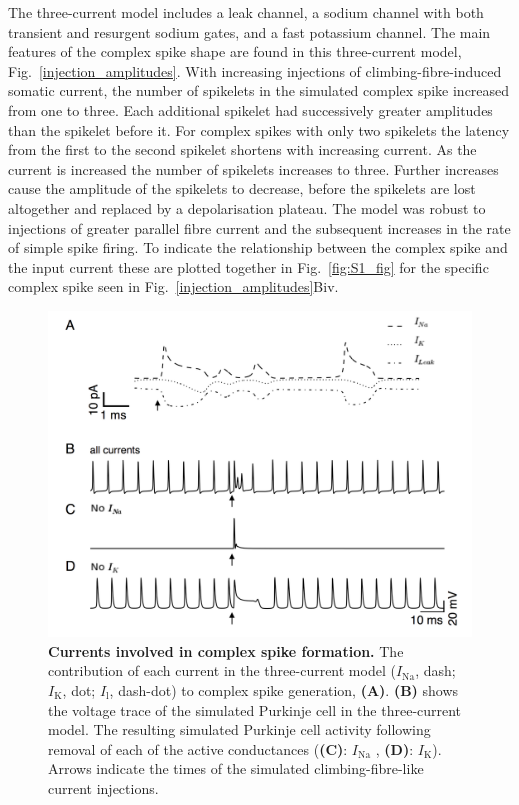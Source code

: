 \documentclass[twocolumn]{svjour3}          %
\renewcommand{\k}{\mathrm{K}}
\newcommand{\na}{\mathrm{Na}}
\newcommand{\leak}{\mathrm{l}}
\begin{document}
The three-current model includes a leak channel, a sodium channel with
both transient and resurgent sodium gates, and a fast potassium
channel. The main features of the complex spike shape are found in
this three-current model, Fig.~\ref{injection_amplitudes}. With
increasing injections of climbing-fibre-induced somatic current, the
number of spikelets in the simulated complex spike increased from one
to three. Each additional spikelet had successively greater amplitudes
than the spikelet before it. For complex spikes with only two
spikelets the latency from the first to the second spikelet shortens
with increasing current. As the current is increased the number of
spikelets increases to three. Further increases cause the amplitude of
the spikelets to decrease, before the spikelets are lost altogether
and replaced by a depolarisation plateau. The model was robust to
injections of greater parallel fibre current and the subsequent
increases in the rate of simple spike firing. To indicate the
relationship between the complex spike and the input current these are
plotted together in Fig.~\ref{fig:S1_fig} for the specific complex
spike seen in Fig.~\ref{injection_amplitudes}Biv.


\begin{figure}[!ht]
  \includegraphics[width=\linewidth]{Figure3.png}
\caption{\textbf{Currents involved in complex spike formation.} The
contribution of each current in the three-current model ($I_{\na}$,
dash; $I_{\k}$, dot; $I_{\leak}$, dash-dot) to
complex spike generation, \textbf{(A)}. \textbf{(B)} shows the
 voltage trace of the simulated Purkinje cell in the three-current model. The resulting simulated Purkinje cell activity
following removal of each of the active conductances (\textbf{(C)}: $I_{\na}$
, \textbf{(D)}: $I_{\k}$). Arrows
indicate the times of the simulated climbing-fibre-like current
injections.}
\label{currents}
\end{figure}
\end{document}
